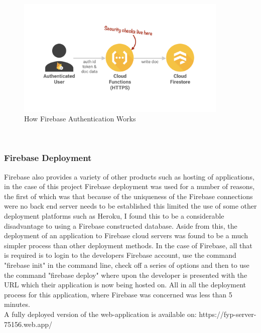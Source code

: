 \newpage
\begin{figure}[h!]
    	\caption{How Firebase Authentication Works}
	\centering
	\includegraphics[width=0.9\textwidth]{images/fireauth.png}
\end{figure}
\\

\subsubsection{Firebase Deployment}
Firebase also provides a variety of other products such as hosting of applications, in the case of this project Firebase deployment was used for a number of reasons, the first of which was that because of the uniqueness of the Firebase connections were no back end server needs to be established this limited the use of some other deployment platforms such as Heroku, I found this to be a considerable disadvantage to using a Firebase constructed database. Aside from this, the deployment of an application to Firebase cloud servers was found to be a much simpler process than other deployment methods. In the case of Firebase, all that is required is to login to the developers Firebase account, use the command "firebase init" in the command line, check off a series of options and then to use the command "firebase deploy" \cite{firedeploy} where upon the developer is presented with the URL which their application is now being hosted on. All in all the deployment process for this application, where Firebase was concerned was less than 5 minutes. \\

A fully deployed version of the web-application is available on: https://fyp-server-75156.web.app/ \\

